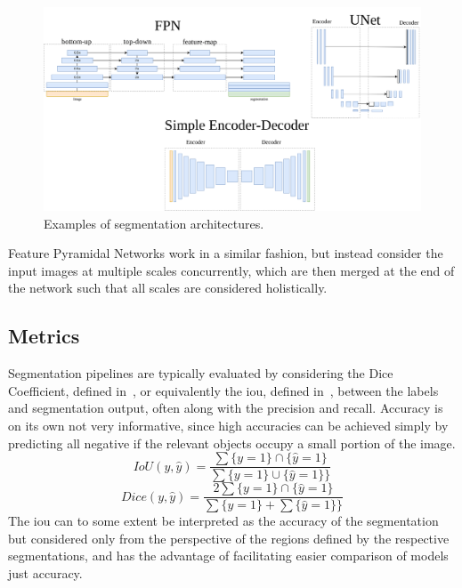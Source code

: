     \begin{figure}[htb]
        \centering
        \includegraphics[width=\linewidth]{illustrations/segmentation_models.png}
        \caption{Examples of segmentation architectures.}
        \label{fig:model_expl}
    \end{figure}
    
    Feature Pyramidal Networks work in a similar fashion, but instead consider the input images at multiple scales concurrently, which are then merged at the end of the network such that all scales are considered holistically.
    
    \subsection{Metrics}
        Segmentation pipelines are typically evaluated by considering the Dice Coefficient, defined in~, or equivalently the \gls{iou}, defined in~, between the labels and segmentation output, often along with the precision and recall. Accuracy is on its own not very informative, since high accuracies can be achieved simply by predicting all negative if the relevant objects occupy a small portion of the image.
        \begin{equation}\label{eq:iou}
            IoU(y, \hat{y}) = \frac{\sum \{y=1\}\cap\{\hat{y}=1\} }{\sum \{y=1\} \cup \{\hat{y}=1\}\}}
        \end{equation}
        \begin{equation}\label{eq:dice}
            Dice(y, \hat{y}) = \frac{2\sum \{y=1\}\cap\{\hat{y}=1\} }{\sum \{y=1\} + \sum \{\hat{y}=1\}\}}
        \end{equation}
        The \gls{iou} can to some extent be interpreted as the accuracy of the segmentation but considered only from the perspective of the regions defined by the respective segmentations, and has the advantage of facilitating easier comparison of models just accuracy.
        
